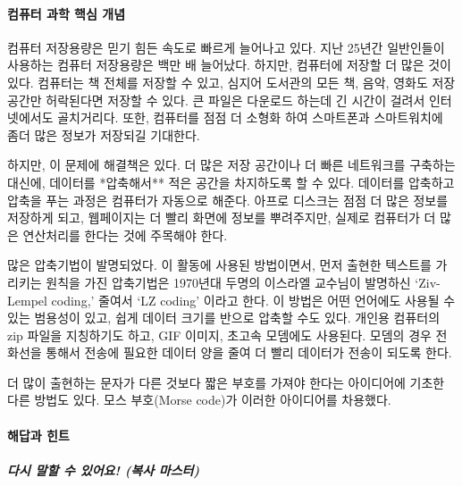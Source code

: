\documentclass[]{article}
\begin{document}
\mbox{}\paragraph{컴퓨터 과학 핵심 개념}\label{section-58}

컴퓨터 저장용량은 믿기 힘든 속도로 빠르게 늘어나고 있다. 지난 25년간
일반인들이 사용하는 컴퓨터 저장용량은 백만 배 늘어났다. 하지만, 컴퓨터에
저장할 더 많은 것이 있다. 컴퓨터는 책 전체를 저장할 수 있고, 심지어
도서관의 모든 책, 음악, 영화도 저장공간만 허락된다면 저장할 수 있다. 큰
파일은 다운로드 하는데 긴 시간이 걸려서 인터넷에서도 골치거리다. 또한,
컴퓨터를 점점 더 소형화 하여 스마트폰과 스마트워치에 좀더 많은 정보가
저장되길 기대한다.

하지만, 이 문제에 해결책은 있다. 더 많은 저장 공간이나 더 빠른
네트워크를 구축하는 대신에, 데이터를 *압축해서** 적은 공간을 차지하도록
할 수 있다. 데이터를 압축하고 압축을 푸는 과정은 컴퓨터가 자동으로
해준다. 아프로 디스크는 점점 더 많은 정보를 저장하게 되고, 웹페이지는 더
빨리 화면에 정보를 뿌려주지만, 실제로 컴퓨터가 더 많은 연산처리를 한다는
것에 주목해야 한다.

많은 압축기법이 발명되었다. 이 활동에 사용된 방법이면서, 먼저 출현한
텍스트를 가리키는 원칙을 가진 압축기법은 1970년대 두명의 이스라엘
교수님이 발명하신 `Ziv-Lempel coding,' 줄여서 `LZ coding' 이라고 한다.
이 방법은 어떤 언어에도 사용될 수 있는 범용성이 있고, 쉽게 데이터 크기를
반으로 압축할 수도 있다. 개인용 컴퓨터의 zip 파일을 지칭하기도 하고, GIF
이미지, 초고속 모뎀에도 사용된다. 모뎀의 경우 전화선을 통해서 전송에
필요한 데이터 양을 줄여 더 빨리 데이터가 전송이 되도록 한다.

더 많이 출현하는 문자가 다른 것보다 짧은 부호를 가져야 한다는 아이디어에
기초한 다른 방법도 있다. 모스 부호(Morse code)가 이러한 아이디어를
차용했다.

\mbox{}\paragraph{해답과 힌트}\label{section-59}

\subparagraph{다시 말할 수 있어요! (복사 마스터)}\label{section-60}
\end{document}
